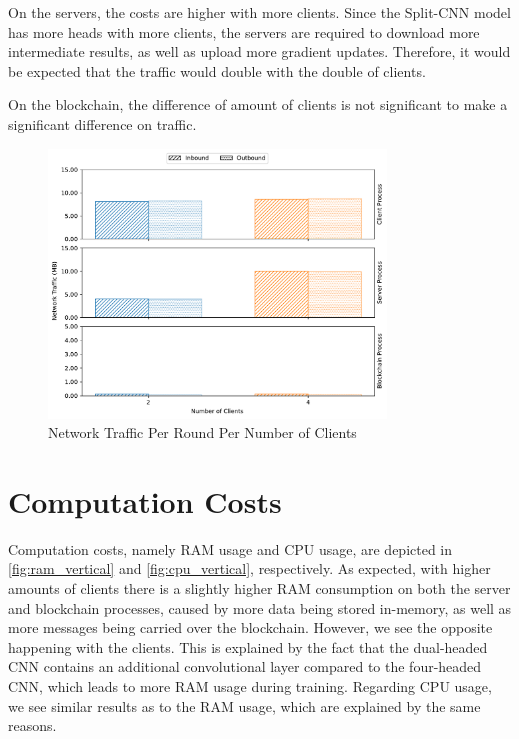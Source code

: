 On the servers, the costs are higher with more clients. Since the Split-CNN model has more heads with more clients, the servers are required to download more intermediate results, as well as upload more gradient updates. Therefore, it would be expected that the traffic would double with the double of clients.

On the blockchain, the difference of amount of clients is not significant to make a significant difference on traffic.

\begin{figure}[!ht]
    \centering
    \centering
    \includegraphics[width=0.8\textwidth]{graphics/vertical/net.pdf}
    \caption{Network Traffic Per Round Per Number of Clients}
    \label{fig:net_vertical}
\end{figure}

\section{Computation Costs}

Computation costs, namely RAM usage and CPU usage, are depicted in \autoref{fig:ram_vertical} and \autoref{fig:cpu_vertical}, respectively. As expected, with higher amounts of clients there is a slightly higher RAM consumption on both the server and blockchain processes, caused by more data being stored in-memory, as well as more messages being carried over the blockchain. However, we see the opposite happening with the clients. This is explained by the fact that the dual-headed CNN contains an additional convolutional layer compared to the four-headed CNN, which leads to more RAM usage during training. Regarding CPU usage, we see similar results as to the RAM usage, which are explained by the same reasons.

